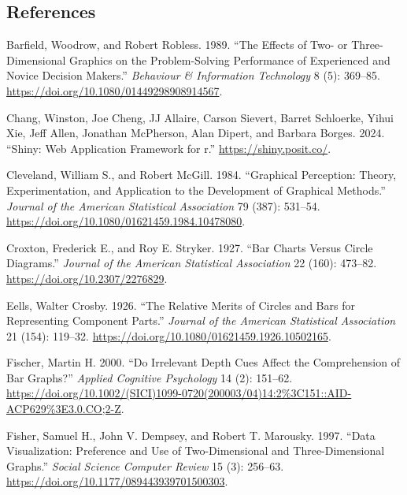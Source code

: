 \documentclass[
  letterpaper,
  DIV=11,
  numbers=noendperiod]{scrartcl}
\newlength{\cslhangindent}
\newenvironment{CSLReferences}[2] %
 {\begin{list}{}{%
  \setlength{\itemindent}{0pt}
  \setlength{\leftmargin}{0pt}
  \setlength{\parsep}{0pt}
  \ifodd #1
   \setlength{\leftmargin}{\cslhangindent}
   \setlength{\itemindent}{-1\cslhangindent}
  \fi
  \setlength{\itemsep}{#2\baselineskip}}}
 {\end{list}}
\begin{document}
\newpage

\subsection{References}\label{references}

\label{refs}
\begin{CSLReferences}{1}{0}
Barfield, Woodrow, and Robert Robless. 1989. {``The Effects of Two- or
Three-Dimensional Graphics on the Problem-Solving Performance of
Experienced and Novice Decision Makers.''} \emph{Behaviour \&
Information Technology} 8 (5): 369--85.
\url{https://doi.org/10.1080/01449298908914567}.

Chang, Winston, Joe Cheng, JJ Allaire, Carson Sievert, Barret Schloerke,
Yihui Xie, Jeff Allen, Jonathan McPherson, Alan Dipert, and Barbara
Borges. 2024. {``Shiny: Web Application Framework for r.''}
\url{https://shiny.posit.co/}.

Cleveland, William S., and Robert McGill. 1984. {``Graphical Perception:
Theory, Experimentation, and Application to the Development of Graphical
Methods.''} \emph{Journal of the American Statistical Association} 79
(387): 531--54. \url{https://doi.org/10.1080/01621459.1984.10478080}.

Croxton, Frederick E., and Roy E. Stryker. 1927. {``Bar Charts Versus
Circle Diagrams.''} \emph{Journal of the American Statistical
Association} 22 (160): 473--82. \url{https://doi.org/10.2307/2276829}.

Eells, Walter Crosby. 1926. {``The Relative Merits of Circles and Bars
for Representing Component Parts.''} \emph{Journal of the American
Statistical Association} 21 (154): 119--32.
\url{https://doi.org/10.1080/01621459.1926.10502165}.

Fischer, Martin H. 2000. {``Do Irrelevant Depth Cues Affect the
Comprehension of Bar Graphs?''} \emph{Applied Cognitive Psychology} 14
(2): 151--62.
\url{https://doi.org/10.1002/(SICI)1099-0720(200003/04)14:2\%3C151::AID-ACP629\%3E3.0.CO;2-Z}.

Fisher, Samuel H., John V. Dempsey, and Robert T. Marousky. 1997.
{``Data Visualization: Preference and Use of Two-Dimensional and
Three-Dimensional Graphs.''} \emph{Social Science Computer Review} 15
(3): 256--63. \url{https://doi.org/10.1177/089443939701500303}.


\end{CSLReferences}
\end{document}
